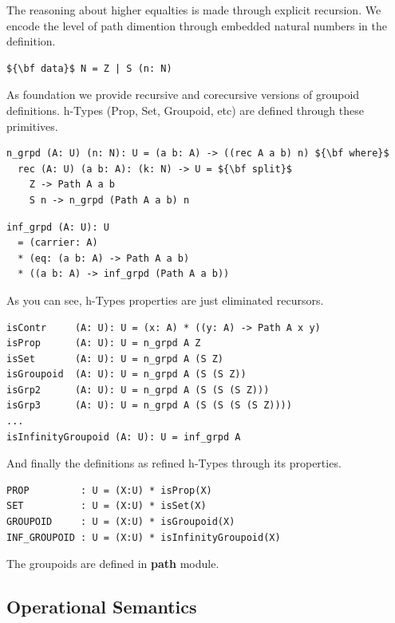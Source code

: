 \documentclass{article}
\begin{document}
The reasoning about higher equalties is made through explicit recursion.
We encode the level of path dimention through embedded natural numbers in the definition.

\begin{lstlisting}[mathescape=true]
${\bf data}$ N = Z | S (n: N)
\end{lstlisting}

As foundation we provide recursive and corecursive versions of groupoid definitions.
h-Types \cite{HoTT} (Prop, Set, Groupoid, etc) are defined through these primitives.

\begin{lstlisting}[mathescape=true]
n_grpd (A: U) (n: N): U = (a b: A) -> ((rec A a b) n) ${\bf where}$
  rec (A: U) (a b: A): (k: N) -> U = ${\bf split}$
    Z -> Path A a b
    S n -> n_grpd (Path A a b) n
\end{lstlisting}

\begin{lstlisting}
inf_grpd (A: U): U
  = (carrier: A)
  * (eq: (a b: A) -> Path A a b)
  * ((a b: A) -> inf_grpd (Path A a b))
\end{lstlisting}

As you can see, h-Types properties are just eliminated recursors.

\begin{lstlisting}[mathescape=true]
isContr     (A: U): U = (x: A) * ((y: A) -> Path A x y)
isProp      (A: U): U = n_grpd A Z
isSet       (A: U): U = n_grpd A (S Z)
isGroupoid  (A: U): U = n_grpd A (S (S Z))
isGrp2      (A: U): U = n_grpd A (S (S (S Z)))
isGrp3      (A: U): U = n_grpd A (S (S (S (S Z))))
...
isInfinityGroupoid (A: U): U = inf_grpd A
\end{lstlisting}

And finally the definitions as refined h-Types through its properties.

\begin{lstlisting}[mathescape=true]
PROP         : U = (X:U) * isProp(X)
SET          : U = (X:U) * isSet(X)
GROUPOID     : U = (X:U) * isGroupoid(X)
INF_GROUPOID : U = (X:U) * isInfinityGroupoid(X)
\end{lstlisting}

The groupoids are defined in {\bf path} module.

\subsection{Operational Semantics}
\end{document}
